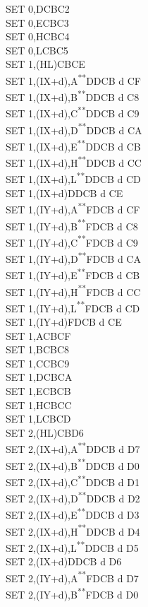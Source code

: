 \documentclass[twoside,openright,a4paper]{book}
\newcommand{\UNDOC}{\textnormal{\textsuperscript{**}}}
\begin{document}
\begin{multicols}{3}
{\begin{tabbing}
	SET 0,D\>CBC2\\
	SET 0,E\>CBC3\\
	SET 0,H\>CBC4\\
	SET 0,L\>CBC5\\
	SET 1,(HL)\>CBCE\\
	SET 1,(IX+d),A\UNDOC\>DDCB d CF\\
	SET 1,(IX+d),B\UNDOC\>DDCB d C8\\
	SET 1,(IX+d),C\UNDOC\>DDCB d C9\\
	SET 1,(IX+d),D\UNDOC\>DDCB d CA\\
	SET 1,(IX+d),E\UNDOC\>DDCB d CB\\
	SET 1,(IX+d),H\UNDOC\>DDCB d CC\\
	SET 1,(IX+d),L\UNDOC\>DDCB d CD\\
	SET 1,(IX+d)\>DDCB d CE\\
	SET 1,(IY+d),A\UNDOC\>FDCB d CF\\
	SET 1,(IY+d),B\UNDOC\>FDCB d C8\\
	SET 1,(IY+d),C\UNDOC\>FDCB d C9\\
	SET 1,(IY+d),D\UNDOC\>FDCB d CA\\
	SET 1,(IY+d),E\UNDOC\>FDCB d CB\\
	SET 1,(IY+d),H\UNDOC\>FDCB d CC\\
	SET 1,(IY+d),L\UNDOC\>FDCB d CD\\
	SET 1,(IY+d)\>FDCB d CE\\
	SET 1,A\>CBCF\\
	SET 1,B\>CBC8\\
	SET 1,C\>CBC9\\
	SET 1,D\>CBCA\\
	SET 1,E\>CBCB\\
	SET 1,H\>CBCC\\
	SET 1,L\>CBCD\\
	SET 2,(HL)\>CBD6\\
	SET 2,(IX+d),A\UNDOC\>DDCB d D7\\
	SET 2,(IX+d),B\UNDOC\>DDCB d D0\\
	SET 2,(IX+d),C\UNDOC\>DDCB d D1\\
	SET 2,(IX+d),D\UNDOC\>DDCB d D2\\
	SET 2,(IX+d),E\UNDOC\>DDCB d D3\\
	SET 2,(IX+d),H\UNDOC\>DDCB d D4\\
	SET 2,(IX+d),L\UNDOC\>DDCB d D5\\
	SET 2,(IX+d)\>DDCB d D6\\
	SET 2,(IY+d),A\UNDOC\>FDCB d D7\\
	SET 2,(IY+d),B\UNDOC\>FDCB d D0\\

\end{tabbing}}
\end{multicols}
\end{document}
